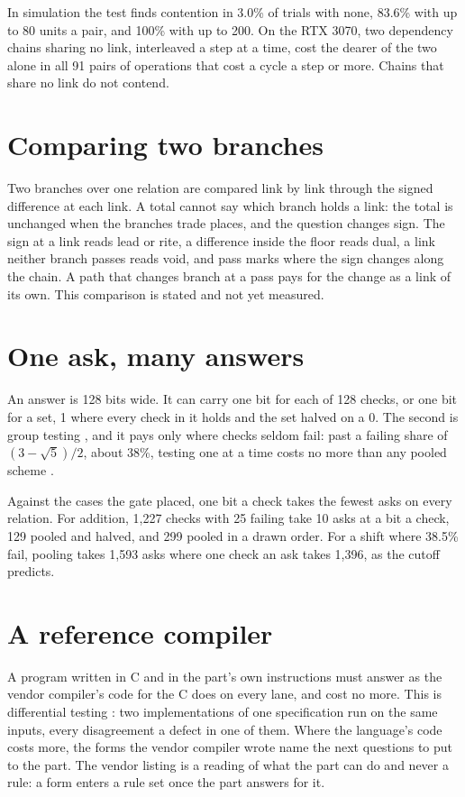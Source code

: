 In simulation the test finds contention in 3.0\% of trials with none, 83.6\% with up to 80 units
a pair, and 100\% with up to 200. On the RTX 3070, two dependency chains sharing no link,
interleaved a step at a time, cost the dearer of the two alone in all 91 pairs of operations that
cost a cycle a step or more. Chains that share no link do not contend.

\section{Comparing two branches}

Two branches over one relation are compared link by link through the signed difference at each
link. A total cannot say which branch holds a link: the total is unchanged when the branches
trade places, and the question changes sign. The sign at a link reads lead or rite, a difference
inside the floor reads dual, a link neither branch passes reads void, and pass marks where the
sign changes along the chain. A path that changes branch at a pass pays for the change as a link
of its own. This comparison is stated and not yet measured.

\section{One ask, many answers}

An answer is 128 bits wide. It can carry one bit for each of 128 checks, or one bit for a set,
1 where every check in it holds and the set halved on a 0. The second is group testing
\cite{src:Dorfman}, and it pays only where checks seldom fail: past a failing share of
\((3-\sqrt5)/2\), about 38\%, testing one at a time costs no more than any pooled scheme
\cite{src:Ungar}.

Against the cases the gate placed, one bit a check takes the fewest asks on every relation. For
addition, 1,227 checks with 25 failing take 10 asks at a bit a check, 129 pooled and halved, and
299 pooled in a drawn order. For a shift where 38.5\% fail, pooling takes 1,593 asks where one
check an ask takes 1,396, as the cutoff predicts.

\section{A reference compiler}

A program written in C and in the part's own instructions must answer as the vendor compiler's
code for the C does on every lane, and cost no more. This is differential testing
\cite{src:McKeeman}: two implementations of one specification run on the same inputs, every
disagreement a defect in one of them. Where the language's code costs more, the forms the vendor
compiler wrote name the next questions to put to the part. The vendor listing is a reading of
what the part can do and never a rule: a form enters a rule set once the part answers for it.

